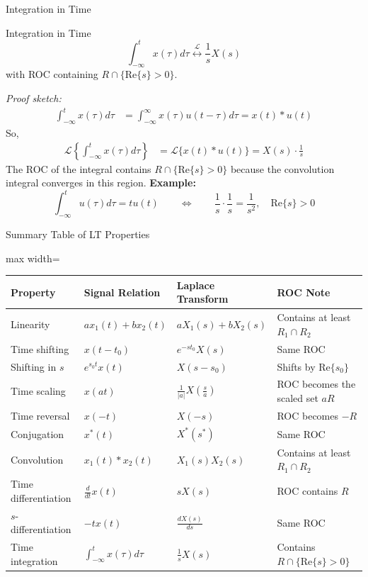 \begin{frame}[t]{Integration in Time}
  \small
  \begin{conceptbox}{Integration in Time}
    \[
      \int_{-\infty}^{t}x(\tau)d\tau
      \stackrel{\mathcal{L}}{\longleftrightarrow}
      \frac{1}{s}X(s)
    \]
    with ROC containing $R\cap\{\text{Re}\{s\}>0\}$.
  \end{conceptbox}
  \textit{Proof sketch:}
  \begin{align*}
    \int_{-\infty}^{t}x(\tau)d\tau & = \int_{-\infty}^{\infty} x(\tau) u(t-\tau) d\tau = x(t)*u(t)
  \end{align*}
  So,
  \begin{align*}
    \mathcal{L}\left\{\int_{-\infty}^{t}x(\tau)d\tau\right\} & = \mathcal{L}\{x(t)*u(t)\} = X(s) \cdot \frac{1}{s}
  \end{align*}
  The ROC of the integral contains $R\cap\{\text{Re}\{s\}>0\}$ because the convolution integral converges in this region.
  \textbf{Example:}
  \[
    \int_{-\infty}^{t}u(\tau)d\tau = tu(t)
    \qquad \Longleftrightarrow \qquad
    \frac{1}{s}\cdot \frac{1}{s} = \frac{1}{s^2},
    \quad \text{Re}\{s\}>0
  \]
\end{frame}

\begin{frame}{Summary Table of LT Properties}
  \centering
  \renewcommand{\arraystretch}{1.35}
  \begin{adjustbox}{max width=\textwidth}
    \begin{tabular}{>{\RaggedRight\arraybackslash}p{2.9cm} >{\RaggedRight\arraybackslash}p{3.8cm} >{\RaggedRight\arraybackslash}p{4.2cm} >{\RaggedRight\arraybackslash}p{4.2cm}}
      \toprule
      \textbf{Property} & \textbf{Signal Relation} & \textbf{Laplace Transform} & \textbf{ROC Note} \\
      \midrule
      Linearity & $a x_1(t)+b x_2(t)$ & $aX_1(s)+bX_2(s)$ & Contains at least $R_1\cap R_2$ \\
      Time shifting & $x(t-t_0)$ & $e^{-st_0}X(s)$ & Same ROC \\
      Shifting in $s$ & $e^{s_0 t}x(t)$ & $X(s-s_0)$ & Shifts by $\text{Re}\{s_0\}$ \\
      Time scaling & $x(at)$ & $\frac{1}{|a|}X\!\left(\frac{s}{a}\right)$ & ROC becomes the scaled set $aR$ \\
      Time reversal & $x(-t)$ & $X(-s)$ & ROC becomes $-R$ \\
      Conjugation & $x^*(t)$ & $X^*(s^*)$ & Same ROC \\
      Convolution & $x_1(t)*x_2(t)$ & $X_1(s)X_2(s)$ & Contains at least $R_1\cap R_2$ \\
      Time differentiation & $\frac{d}{dt}x(t)$ & $sX(s)$ & ROC contains $R$ \\
      $s$-differentiation & $-tx(t)$ & $\frac{dX(s)}{ds}$ & Same ROC \\
      Time integration & $\int_{-\infty}^{t}x(\tau)d\tau$ & $\frac{1}{s}X(s)$ & Contains $R\cap\{\text{Re}\{s\}>0\}$ \\
      \bottomrule
    \end{tabular}
  \end{adjustbox}
\end{frame}

